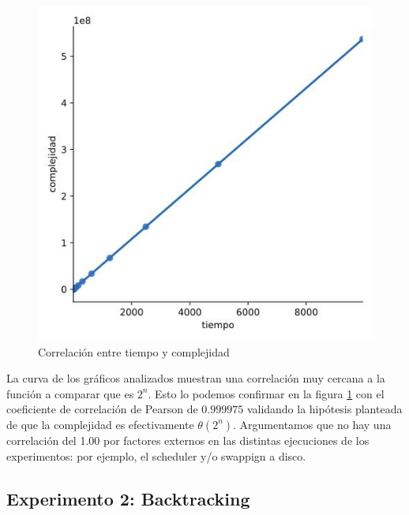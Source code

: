 \documentclass[10pt,a4paper]{article}
\begin{document}
\begin{figure}[h!]
	\centering
		\includegraphics[scale=0.35]{img/fb-correlacion.jpg}
		\caption{Correlación entre tiempo y complejidad}
		\label{fig:fb-correlacion}
\end{figure}
\newline
La curva de los gráficos analizados muestran una correlación muy cercana a la función a comparar que es $2^{n}$. Esto lo podemos confirmar en la figura \ref{fig:fb-correlacion} con el
coeficiente de correlación de Pearson\cite{ref:pearson} de $0.999975$ validando la hipótesis planteada de que la complejidad es efectivamente $\theta(2^n)$. Argumentamos que no hay una correlación del 1.00 por factores externos en las distintas ejecuciones de los experimentos: por ejemplo, el scheduler y/o swappign a disco.
\newpage
\subsection{Experimento 2: Backtracking}
\end{document}
